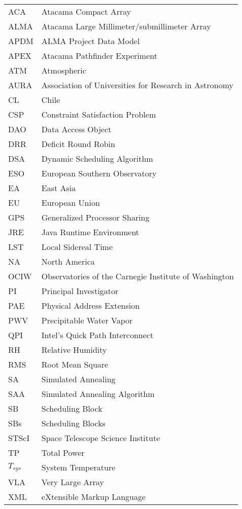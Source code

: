 \begin{table}[h!t]
  \begin{tabular}{ll}
  ACA & Atacama Compact Array \\
  ALMA & Atacama Large Millimeter/submillimeter Array\\
  APDM & ALMA Project Data Model \\
  APEX & Atacama Pathfinder Experiment \\
  ATM & Atmospheric \\
  AURA & Association of Universities for Research in Astronomy \\
  CL & Chile \\
  CSP & Constraint Satisfaction Problem \\
  DAO & Data Access Object \\ 
  DRR & Deficit Round Robin \\
  DSA & Dynamic Scheduling Algorithm \\
  ESO & European Southern Observatory \\
  EA & East Asia \\
  EU & European Union \\
  GPS & Generalized Processor Sharing \\
  JRE & Java Runtime Environment \\
  LST & Local Sidereal Time \\
  NA & North America \\
  OCIW & Observatories of the Carnegie Institute of Washington\\ 
  PI & Principal Investigator \\
  PAE & Physical Address Extension \\
  PWV & Precipitable Water Vapor \\
  QPI & Intel's Quick Path Interconnect \\
  RH & Relative Humidity \\
  RMS & Root Mean Square \\
  SA & Simulated Annealing \\
  SAA & Simulated Annealing Algorithm \\
  SB & Scheduling Block \\
  SBs & Scheduling Blocks \\
  STScI & Space Telescope Science Institute \\
  TP & Total Power \\
  $T_{sys}$ & System Temperature \\ 
  VLA & Very Large Array \\
  XML & eXtensible Markup Language \\
  \end{tabular}
\end{table}